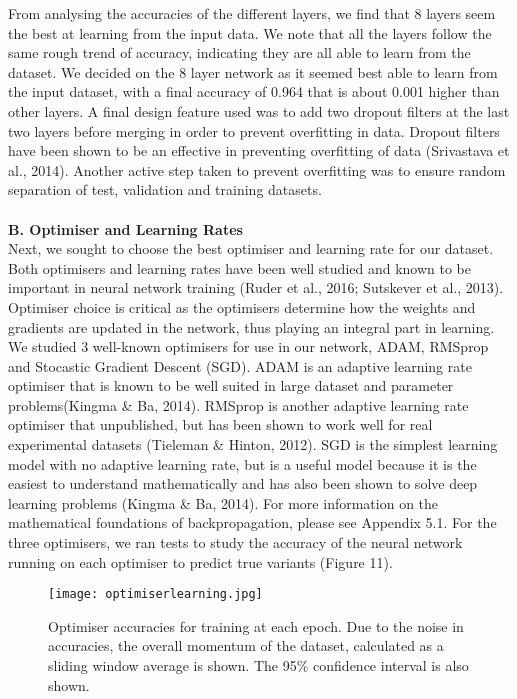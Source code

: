 \documentclass{article}
\begin{document}
From analysing the accuracies of the different layers, we find that 8 layers seem the best at learning from the input data. We note that all the layers follow the same rough trend of accuracy, indicating they are all able to learn from the dataset. We decided on the 8 layer network as it seemed best able to learn from the input dataset, with a final accuracy of 0.964 that is about 0.001 higher than other layers. A final design feature used was to add two dropout filters at the last two layers before merging in order to prevent overfitting in data. Dropout filters have been shown to be an effective in preventing overfitting of data (Srivastava et al., 2014). Another active step taken to prevent overfitting was to ensure random separation of test, validation and training datasets.\\\\

\textbf{B. Optimiser and Learning Rates}\\
Next, we sought to choose the best optimiser and learning rate for our dataset. Both optimisers and learning rates have  been well studied and known to be important in neural network training (Ruder et al., 2016; Sutskever et al., 2013). Optimiser choice is critical as the optimisers determine how the weights and gradients are updated in the network, thus playing an integral part in learning. We studied 3 well-known optimisers for use in our network, ADAM, RMSprop and Stocastic Gradient Descent (SGD). ADAM is an adaptive learning rate optimiser that is known to be well suited in large dataset and parameter problems(Kingma \& Ba, 2014). RMSprop is another adaptive learning rate optimiser that unpublished, but has been shown to work well for real experimental datasets (Tieleman \& Hinton, 2012). SGD is the simplest learning model with no adaptive learning rate, but is a useful model because it is the easiest to understand mathematically and has also been shown to solve deep learning problems (Kingma \& Ba, 2014). For more information on the mathematical foundations of backpropagation, please see Appendix 5.1. For the three optimisers, we ran tests to study the accuracy of the neural network running on each optimiser to predict true variants (Figure 11).
\begin{figure}[H]
\texttt{[image: optimiserlearning.jpg]}
\centering
\caption{Optimiser accuracies for training at each epoch. Due to the noise in accuracies, the overall momentum of the dataset, calculated as a sliding window average is shown. The 95\% confidence interval is also shown.}
\end{figure}
\end{document}
